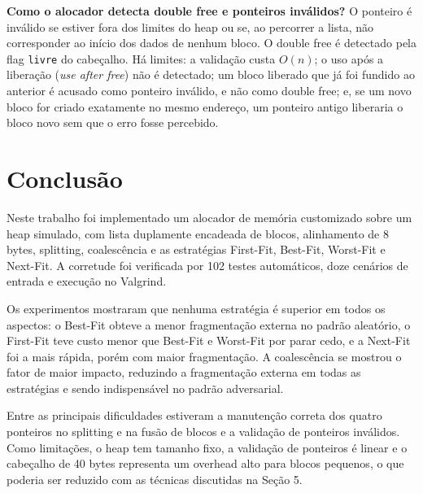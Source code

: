 \textbf{Como o alocador detecta double free e ponteiros inválidos?} O ponteiro
é inválido se estiver fora dos limites do heap ou se, ao percorrer a lista, não
corresponder ao início dos dados de nenhum bloco. O double free é detectado
pela flag \texttt{livre} do cabeçalho. Há limites: a validação custa $O(n)$; o
uso após a liberação (\textit{use after free}) não é detectado; um bloco
liberado que já foi fundido ao anterior é acusado como ponteiro inválido, e não
como double free; e, se um novo bloco for criado exatamente no mesmo endereço,
um ponteiro antigo liberaria o bloco novo sem que o erro fosse percebido.


\section{Conclusão}

Neste trabalho foi implementado um alocador de memória customizado sobre um
heap simulado, com lista duplamente encadeada de blocos, alinhamento de 8
bytes, splitting, coalescência e as estratégias First-Fit, Best-Fit, Worst-Fit e
Next-Fit. A corretude foi verificada por 102 testes automáticos, doze cenários
de entrada e execução no Valgrind.

Os experimentos mostraram que nenhuma estratégia é superior em todos os
aspectos: o Best-Fit obteve a menor fragmentação externa no padrão aleatório,
o First-Fit teve custo menor que Best-Fit e Worst-Fit por parar cedo, e a
Next-Fit foi a mais rápida, porém com maior fragmentação. A coalescência se
mostrou o fator de maior impacto, reduzindo a fragmentação externa em todas as
estratégias e sendo indispensável no padrão adversarial.

Entre as principais dificuldades estiveram a manutenção correta dos quatro
ponteiros no splitting e na fusão de blocos e a validação de ponteiros
inválidos. Como limitações, o heap tem tamanho fixo, a validação de ponteiros
é linear e o cabeçalho de 40 bytes representa um overhead alto para blocos
pequenos, o que poderia ser reduzido com as técnicas discutidas na Seção 5.



%
